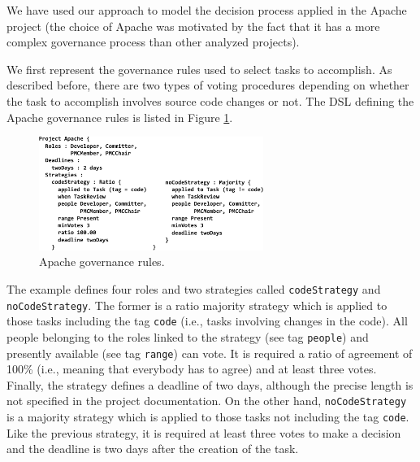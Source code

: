 We have used our approach to model the decision process applied in the Apache project (the choice of Apache was motivated by the fact that it has a more complex governance process than other analyzed projects). 

We first represent the governance rules used to select tasks to accomplish. As described before, there are two types of voting procedures depending on whether the task to accomplish involves source code changes or not. The DSL defining the Apache governance rules is listed in Figure \ref{fig:rulesApache}.

\begin{figure}[t]
  \centering
  \includegraphics[width=0.65\textwidth]{./figures/apache}
  \caption{Apache governance rules.}
  \label{fig:rulesApache}
\end{figure}



The example defines four roles and two strategies called \texttt{codeStrategy} and \texttt{noCodeStrategy}. The former is a ratio majority strategy which is applied to those tasks including the tag \texttt{code} (i.e., tasks involving changes in the code). All people belonging to the roles linked to the strategy (see tag \texttt{people}) and presently available (see tag \texttt{range}) can vote. It is required a ratio of agreement of 100\% (i.e., meaning that everybody has to agree) and at least three votes. Finally, the strategy defines a deadline of two days, although the precise length is not specified in the project documentation. On the other hand, \texttt{noCodeStrategy} is a majority strategy which is applied to those tasks not including the tag \texttt{code}. Like the previous strategy, it is required at least three votes to make a decision and the deadline is two days after the creation of the task. 


